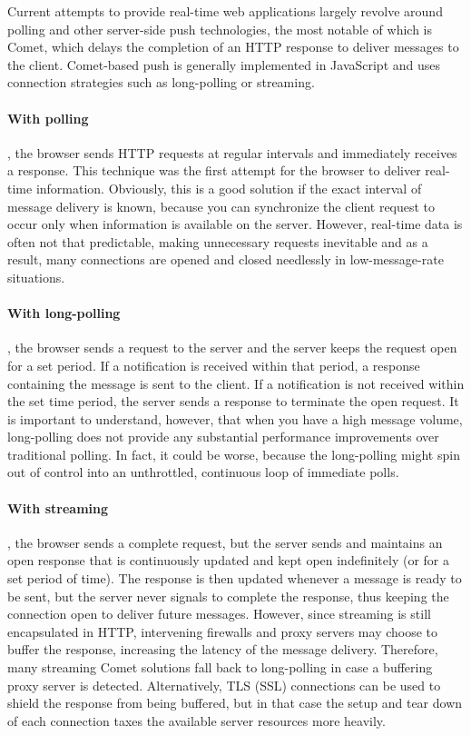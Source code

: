 \documentclass[12pt]{scrartcl}
\begin{document}
Current attempts to provide real-time web applications largely revolve around polling and other server-side push technologies, the most notable of which is Comet, which delays the completion of an HTTP response to deliver messages to the client. Comet-based push is generally implemented in JavaScript and uses connection strategies such as long-polling or streaming.

\paragraph{With polling}, the browser sends HTTP requests at regular intervals and immediately receives a response.  This technique was the first attempt for the browser to deliver real-time information. Obviously, this is a good solution if the exact interval of message delivery is known, because you can synchronize the client request to occur only when information is available on the server. However, real-time data is often not that predictable, making unnecessary requests inevitable and as a result, many connections are opened and closed needlessly in low-message-rate situations.

\paragraph{With long-polling}, the browser sends a request to the server and the server keeps the request open for a set period. If a notification is received within that period, a response containing the message is sent to the client. If a notification is not received within the set time period, the server sends a response to terminate the open request. It is important to understand, however, that when you have a high message volume, long-polling does not provide any substantial performance improvements over traditional polling.  In fact, it could be worse, because the long-polling might spin out of control into an unthrottled, continuous loop of immediate polls.

\paragraph{With streaming}, the browser sends a complete request, but the server sends and maintains an open response that is continuously updated and kept open indefinitely (or for a set period of time). The response is then updated whenever a message is ready to be sent, but the server never signals to complete the response, thus keeping the connection open to deliver future messages. However, since streaming is still encapsulated in HTTP, intervening firewalls and proxy servers may choose to buffer the response, increasing the latency of the message delivery. Therefore, many streaming Comet solutions fall back to long-polling in case a buffering proxy server is detected. Alternatively, TLS (SSL) connections can be used to shield the response from being buffered, but in that case the setup and tear down of each connection taxes the available server resources more heavily.
\end{document}
